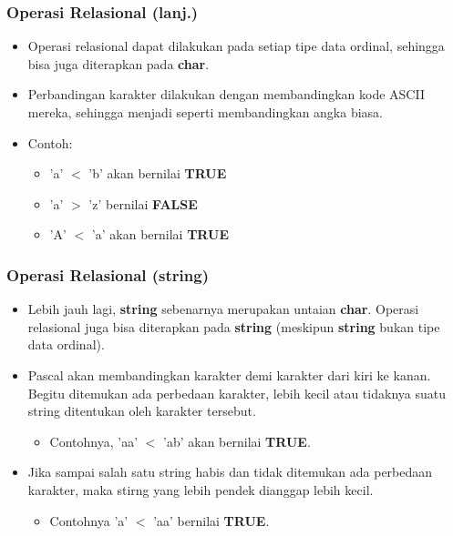 \documentclass{beamer}
\begin{document}
\begin{frame}
\frametitle{Operasi Relasional (lanj.)}
\begin{itemize}
    \item Operasi relasional dapat dilakukan pada setiap tipe data ordinal, sehingga bisa juga diterapkan pada \textbf{char}.
    \item Perbandingan karakter dilakukan dengan membandingkan kode ASCII mereka, sehingga menjadi seperti membandingkan angka biasa.
    \item Contoh:
    \begin{itemize}
        \item 'a' $<$ 'b' akan bernilai \textbf{TRUE}
        \item 'a' $>$ 'z' bernilai \textbf{FALSE}
        \item 'A' $<$ 'a' akan bernilai \textbf{TRUE}
    \end{itemize}
\end{itemize}
\end{frame}

\begin{frame}
\frametitle{Operasi Relasional (string)}
\begin{itemize}
    \item Lebih jauh lagi, \textbf{string} sebenarnya merupakan untaian \textbf{char}. Operasi relasional juga bisa diterapkan pada \textbf{string} (meskipun \textbf{string} bukan tipe data ordinal).
    \item Pascal akan membandingkan karakter demi karakter dari kiri ke kanan. Begitu ditemukan ada perbedaan karakter, lebih kecil atau tidaknya suatu string ditentukan oleh karakter tersebut.
    \begin{itemize}
        \item Contohnya, 'aa' $<$ 'ab' akan bernilai \textbf{TRUE}.
    \end{itemize}
    \item Jika sampai salah satu string habis dan tidak ditemukan ada perbedaan karakter, maka stirng yang lebih pendek dianggap lebih kecil.
    \begin{itemize}
        \item Contohnya 'a' $<$ 'aa' bernilai \textbf{TRUE}.
    \end{itemize}
\end{itemize}
\end{frame}
\end{document}
